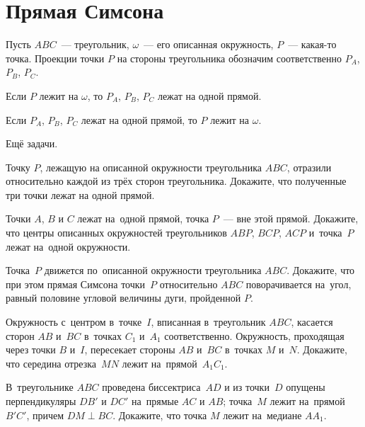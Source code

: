 
\section*{Прямая Симсона}





Пусть $ABC$~--- треугольник, $\omega$~--- его описанная окружность, $P$~---
какая-то точка.
Проекции точки $P$ на стороны треугольника обозначим соответственно
$P_A$, $P_B$, $P_C$.

\begin{problems}

\item
Если $P$ лежит на $\omega$, то $P_A$, $P_B$, $P_C$ лежат на одной прямой.

\item
Если $P_A$, $P_B$, $P_C$ лежат на одной прямой, то $P$ лежит на $\omega$.

\end{problems}

Ещё задачи.

\begin{problems}

\item
Точку $P$, лежащую на описанной окружности треугольника $ABC$, отразили
относительно каждой из трёх сторон треугольника.
Докажите, что полученные три точки лежат на одной прямой.

\item
Точки $A$, $B$ и $C$ лежат на~одной прямой, точка $P$~--- вне этой прямой.
Докажите, что центры описанных окружностей треугольников $ABP$, $BCP$, $ACP$
и~точка~$P$ лежат на~одной окружности.

\item
Точка~$P$ движется по~описанной окружности треугольника $ABC$.
Докажите, что при этом прямая Симсона точки~$P$ относительно $ABC$
поворачивается на~угол, равный половине угловой величины дуги, пройденной $P$.

\item
Окружность с~центром в~точке~$I$, вписанная в~треугольник $ABC$, касается
сторон $AB$ и~$BC$ в~точках $C_1$ и~$A_1$ соответственно.
Окружность, проходящая через точки $B$ и~$I$, пересекает стороны $AB$ и~$BC$
в~точках $M$ и~$N$.
Докажите, что середина отрезка~$MN$ лежит на~прямой~$A_1 C_1$.

\item
В~треугольнике $ABC$ проведена биссектриса~$AD$ и из точки~$D$ опущены
перпендикуляры $DB'$ и $DC'$ на~прямые $AC$ и $AB$; точка~$M$ лежит
на~прямой~$B'C'$, причем $DM \perp BC$.
Докажите, что точка $M$ лежит на~медиане $A A_1$.

\end{problems}

